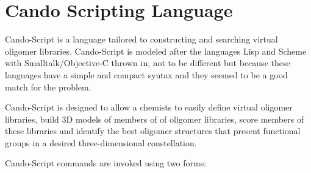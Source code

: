 \chapter{Cando Scripting Language}
Cando-Script is a language tailored to constructing and searching virtual oligomer libraries.
Cando-Script is modeled after the languages Lisp and Scheme with Smalltalk/Objective-C thrown in, not to be different but because
these languages have a simple and compact syntax and they seemed to be a good match for the
problem.\par

Cando-Script is designed to allow a chemists to easily define virtual oligomer libraries, build 3D models of members of of
oligomer libraries, score members of these libraries and identify the best 
oligomer structures that present functional groups
in a desired three-dimensional constellation.\par

Cando-Script commands are invoked using two forms: 

